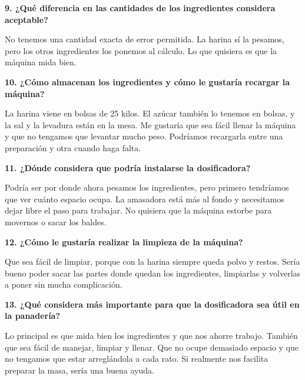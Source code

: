 \par\medskip

\noindent
\textbf{9. ¿Qué diferencia en las cantidades de los ingredientes considera aceptable?}

\par\medskip
No tenemos una cantidad exacta de error permitida. La harina sí la pesamos, pero los otros ingredientes los ponemos al cálculo. Lo que quisiera es que la máquina mida bien.
\par\medskip

\noindent
\textbf{10. ¿Cómo almacenan los ingredientes y cómo le gustaría recargar la máquina?}

\par\medskip
La harina viene en bolsas de 25 kilos. El azúcar también lo tenemos en bolsas, y la sal y la levadura están en la mesa. Me gustaría que sea fácil llenar la máquina y que no tengamos que levantar mucho peso. Podríamos recargarla entre una preparación y otra cuando haga falta.

\par\medskip

\noindent
\textbf{11. ¿Dónde considera que podría instalarse la dosificadora?}

\par\medskip
Podría ser por donde ahora pesamos los ingredientes, pero primero tendríamos que ver cuánto espacio ocupa. La amasadora está más al fondo y necesitamos dejar libre el paso para trabajar. No quisiera que la máquina estorbe para movernos o sacar los baldes.

\par\medskip

\noindent
\textbf{12. ¿Cómo le gustaría realizar la limpieza de la máquina?}

\par\medskip
Que sea fácil de limpiar, porque con la harina siempre queda polvo y restos. Sería bueno poder sacar las partes donde quedan los ingredientes, limpiarlas y volverlas a poner sin mucha complicación.

\par\medskip


\noindent
\textbf{13. ¿Qué considera más importante para que la dosificadora sea útil en la panadería?}

\par\medskip
Lo principal es que mida bien los ingredientes y que nos ahorre trabajo. También que sea fácil de manejar, limpiar y llenar. Que no ocupe demasiado espacio y que no tengamos que estar arreglándola a cada rato. Si realmente nos facilita preparar la masa, sería una buena ayuda.

